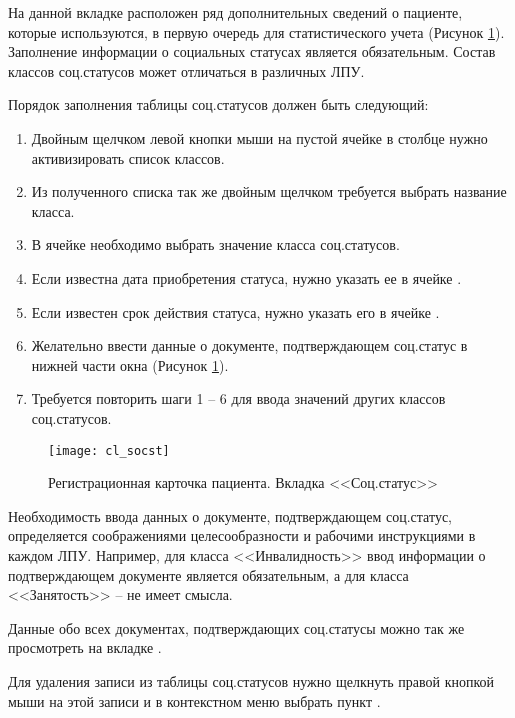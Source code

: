 На данной вкладке расположен ряд дополнительных сведений о пациенте, которые используются, в первую очередь для статистического учета (Рисунок \ref{img_cl_socst}). Заполнение информации о социальных статусах является обязательным. Состав классов соц.статусов может отличаться в различных ЛПУ.

Порядок заполнения таблицы соц.статусов должен быть следующий:
\begin{enumerate}
 \item Двойным щелчком левой кнопки мыши на пустой ячейке в столбце  нужно активизировать список классов.
 \item Из полученного списка так же двойным щелчком требуется выбрать название класса.
 \item В ячейке  необходимо выбрать значение класса соц.статусов.
 \item Если известна дата приобретения статуса, нужно указать ее в ячейке .
 \item Если известен срок действия статуса, нужно указать его в ячейке .
 \item Желательно ввести данные о документе, подтверждающем соц.статус в нижней части окна (Рисунок \ref{img_cl_socst}).
 \item Требуется повторить шаги 1 – 6 для ввода значений других классов соц.статусов.
\end{enumerate}

\begin{figure}[ht]\centering
 \texttt{[image: cl\_socst]}
 \caption{Регистрационная карточка пациента. Вкладка <<Соц.статус>>}
 \label{img_cl_socst}
\end{figure} 

Необходимость ввода данных о документе, подтверждающем соц.статус, определяется соображениями целесообразности и рабочими инструкциями в каждом ЛПУ. Например, для класса <<Инвалидность>> ввод информации о подтверждающем документе является обязательным, а для класса <<Занятость>> – не имеет смысла.

\begin{prim}
Данные обо всех документах, подтверждающих соц.статусы можно так же просмотреть на вкладке .
\end{prim}
 
Для удаления записи из таблицы соц.статусов нужно щелкнуть правой кнопкой мыши на этой записи и в контекстном меню выбрать пункт .

